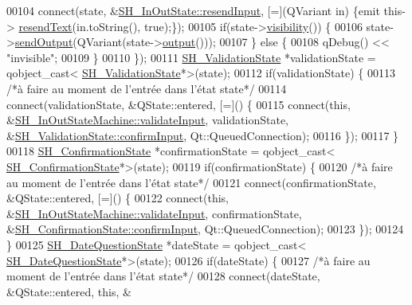 \begin{DoxyCode}
00104         connect(state, &\hyperlink{classSH__InOutState_a1f00480afefd173002cf56d4c4128048}{SH\_InOutState::resendInput}, [=](QVariant in) \{emit this->
      \hyperlink{classSH__InOutStateMachine_a526822c66b46aa0cd81ba4473fa5573f}{resendText}(in.toString(), \textcolor{keyword}{true});\});
00105         \textcolor{keywordflow}{if}(state->\hyperlink{classSH__InOutState_a3a18752c4122c26a2ebf38310c9c1b75}{visibility}()) \{
00106             state->\hyperlink{classSH__InOutState_a77921c5f42059bc97361f4ff7827da12}{sendOutput}(QVariant(state->\hyperlink{classSH__InOutState_a17ed7eaf5e3ed5af80a4f9fe65d5bfd9}{output}()));
00107         \} \textcolor{keywordflow}{else} \{
00108             qDebug() << \textcolor{stringliteral}{"invisible"};
00109         \}
00110     \});
00111     \hyperlink{classSH__ValidationState}{SH\_ValidationState} *validationState = qobject\_cast<
      \hyperlink{classSH__ValidationState}{SH\_ValidationState}*>(state);
00112     \textcolor{keywordflow}{if}(validationState) \{
00113         \textcolor{comment}{/*à faire au moment de l'entrée dans l'état state*/}
00114         connect(validationState, &QState::entered, [=]() \{
00115             connect(\textcolor{keyword}{this}, &\hyperlink{classSH__InOutStateMachine_aec1b3fef3c1f82499aa1f73beaecd08a}{SH\_InOutStateMachine::validateInput}, 
      validationState, &\hyperlink{classSH__ConfirmationState_a039267260de5d102ac7511e6a5fae87f}{SH\_ValidationState::confirmInput}, Qt::QueuedConnection);
00116         \});
00117     \}
00118     \hyperlink{classSH__ConfirmationState}{SH\_ConfirmationState} *confirmationState = qobject\_cast<
      \hyperlink{classSH__ConfirmationState}{SH\_ConfirmationState}*>(state);
00119     \textcolor{keywordflow}{if}(confirmationState) \{
00120         \textcolor{comment}{/*à faire au moment de l'entrée dans l'état state*/}
00121         connect(confirmationState, &QState::entered, [=]() \{
00122             connect(\textcolor{keyword}{this}, &\hyperlink{classSH__InOutStateMachine_aec1b3fef3c1f82499aa1f73beaecd08a}{SH\_InOutStateMachine::validateInput}, 
      confirmationState, &\hyperlink{classSH__ConfirmationState_a039267260de5d102ac7511e6a5fae87f}{SH\_ConfirmationState::confirmInput}, Qt::QueuedConnection);
00123         \});
00124     \}
00125     \hyperlink{classSH__DateQuestionState}{SH\_DateQuestionState} *dateState = qobject\_cast<
      \hyperlink{classSH__DateQuestionState}{SH\_DateQuestionState}*>(state);
00126     \textcolor{keywordflow}{if}(dateState) \{
00127         \textcolor{comment}{/*à faire au moment de l'entrée dans l'état state*/}
00128         connect(dateState, &QState::entered, \textcolor{keyword}{this}, &

\end{DoxyCode}
